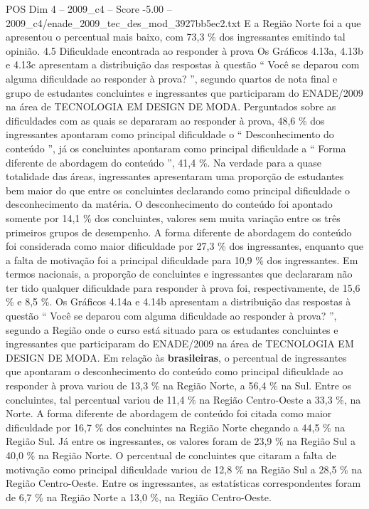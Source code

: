 \begin{textsample}{POS Dim 4 – 2009\_c4 – Score -5.00 – 2009\_c4/enade\_2009\_tec\_des\_mod\_3927bb5ec2.txt}
E a Região Norte foi a que apresentou o percentual mais baixo, com 73,3 \% dos ingressantes emitindo tal opinião. 4.5 Dificuldade encontrada ao responder à prova Os Gráficos 4.13a, 4.13b e 4.13c apresentam a distribuição das respostas à questão “ Você se deparou com alguma dificuldade ao responder à prova? ”, segundo quartos de nota final e grupo de estudantes concluintes e ingressantes que participaram do ENADE/2009 na área de TECNOLOGIA EM DESIGN DE MODA.
Perguntados sobre as dificuldades com as quais se depararam ao responder à prova, 48,6 \% dos ingressantes apontaram como principal dificuldade o “ Desconhecimento do conteúdo ”, já os concluintes apontaram como principal dificuldade a “ Forma diferente de abordagem do conteúdo ”, 41,4 \%.
Na verdade para a quase totalidade das áreas, ingressantes apresentaram uma proporção de estudantes bem maior do que entre os concluintes declarando como principal dificuldade o desconhecimento da matéria.
O desconhecimento do conteúdo foi apontado somente por 14,1 \% dos concluintes, valores sem muita variação entre os três primeiros grupos de desempenho.
A forma diferente de abordagem do conteúdo foi considerada como maior dificuldade por 27,3 \% dos ingressantes, enquanto que a falta de motivação foi a principal dificuldade para 10,9 \% dos ingressantes.
Em termos nacionais, a proporção de concluintes e ingressantes que declararam não ter tido qualquer dificuldade para responder à prova foi, respectivamente, de 15,6 \% e 8,5 \%.
Os Gráficos 4.14a e 4.14b apresentam a distribuição das respostas à questão “ Você se deparou com alguma dificuldade ao responder à prova? ”, segundo a Região onde o curso está situado para os estudantes concluintes e ingressantes que participaram do ENADE/2009 na área de TECNOLOGIA EM DESIGN DE MODA.
Em relação às \textbf{brasileiras}, o percentual de ingressantes que apontaram o desconhecimento do conteúdo como principal dificuldade ao responder à prova variou de 13,3 \% na Região Norte, a 56,4 \% na Sul.
Entre os concluintes, tal percentual variou de 11,4 \% na Região Centro-Oeste a 33,3 \%, na Norte.
A forma diferente de abordagem de conteúdo foi citada como maior dificuldade por 16,7 \% dos concluintes na Região Norte chegando a 44,5 \% na Região Sul.
Já entre os ingressantes, os valores foram de 23,9 \% na Região Sul a 40,0 \% na Região Norte.
O percentual de concluintes que citaram a falta de motivação como principal dificuldade variou de 12,8 \% na Região Sul a 28,5 \% na Região Centro-Oeste.
Entre os ingressantes, as estatísticas correspondentes foram de 6,7 \% na Região Norte a 13,0 \%, na Região Centro-Oeste.

\end{textsample}
